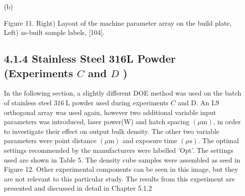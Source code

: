 \documentclass[10pt]{article}
\begin{document}
(b)

Figure 11. Right) Layout of the machine parameter array on the build plate, Left) as-built sample labels, [104].

\subsection*{4.1.4 Stainless Steel 316L Powder (Experiments $C$ and $D$ )}
In the following section, a slightly different DOE method was used on the batch of stainless steel $316 \mathrm{~L}$ powder used during experiments $C$ and D. An L9 orthogonal array was used again, however two additional variable input parameters was introduced, laser power(W) and hatch spacing $(\mu \mathrm{m})$, in order to investigate their effect on output bulk density. The other two variable parameters were point distance $(\mu \mathrm{m})$ and exposure time $(\mu \mathrm{s})$. The optimal settings recommended by the manufacturers were labelled 'Opt'. The settings used are shown in Table 5. The density cube samples were assembled as seed in Figure 12. Other experimental components can be seen in this image, but they are not relevant to this particular study. The results from this experiment are presented and discussed in detail in Chapter 5.1.2
\end{document}
